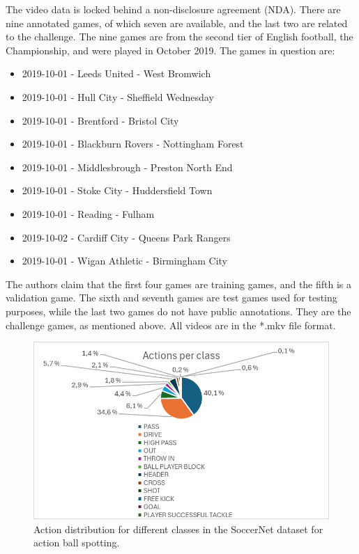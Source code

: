 The video data is locked behind a non-disclosure agreement (NDA). There are nine annotated games, of which seven are available, and the last two are related to the challenge. The nine games are from the second tier of English football, the Championship, and were played in October 2019. The games in question are: 

\begin{itemize}
    \item 2019-10-01 - Leeds United - West Bromwich
    \item 2019-10-01 - Hull City - Sheffield Wednesday
    \item 2019-10-01 - Brentford - Bristol City
    \item 2019-10-01 - Blackburn Rovers - Nottingham Forest
    \item 2019-10-01 - Middlesbrough - Preston North End
    \item 2019-10-01 - Stoke City - Huddersfield Town
    \item 2019-10-01 - Reading - Fulham
    \item 2019-10-02 - Cardiff City - Queens Park Rangers
    \item 2019-10-01 - Wigan Athletic - Birmingham City
\end{itemize}

The authors claim that the first four games are training games, and the fifth is a validation game. The sixth and seventh games are test games used for testing purposes, while the last two games do not have public annotations. They are the challenge games, as mentioned above. All videos are in the *.mkv file format. 

\begin{figure}
    \centering
    \includegraphics[width=1\linewidth]{figures/actions_per_class_2.png}
    \caption{Action distribution for different classes in the SoccerNet dataset for action ball spotting. }
    \label{fig:soccernet_dist}
\end{figure}

